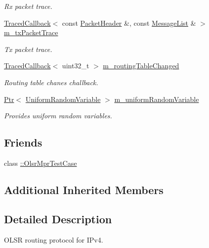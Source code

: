 \begin{DoxyCompactItemize}
\begin{DoxyCompactList}\small\item\em Rx packet trace. \end{DoxyCompactList}\item 
\hyperlink{classns3_1_1TracedCallback}{Traced\+Callback}$<$ const \hyperlink{classns3_1_1olsr_1_1PacketHeader}{Packet\+Header} \&, const \hyperlink{namespacens3_1_1olsr_af17c710718a5637d01f37804a0a53e78}{Message\+List} \& $>$ \hyperlink{classns3_1_1olsr_1_1RoutingProtocol_aadd8d4fea9a32b185bf23d787004de9d}{m\+\_\+tx\+Packet\+Trace}
\begin{DoxyCompactList}\small\item\em Tx packet trace. \end{DoxyCompactList}\item 
\hyperlink{classns3_1_1TracedCallback}{Traced\+Callback}$<$ uint32\+\_\+t $>$ \hyperlink{classns3_1_1olsr_1_1RoutingProtocol_a1cbaa4bdf90462b6d8e0ddc90eaa4130}{m\+\_\+routing\+Table\+Changed}
\begin{DoxyCompactList}\small\item\em Routing table chanes challback. \end{DoxyCompactList}\item 
\hyperlink{classns3_1_1Ptr}{Ptr}$<$ \hyperlink{classns3_1_1UniformRandomVariable}{Uniform\+Random\+Variable} $>$ \hyperlink{classns3_1_1olsr_1_1RoutingProtocol_a5aacf6e47c25a9cedfb2998d09e05193}{m\+\_\+uniform\+Random\+Variable}
\begin{DoxyCompactList}\small\item\em Provides uniform random variables. \end{DoxyCompactList}\end{DoxyCompactItemize}
\subsection*{Friends}
\begin{DoxyCompactItemize}
\item 
class \hyperlink{classns3_1_1olsr_1_1RoutingProtocol_a207c4dff8592b10a0fa2924d05c40380}{\+::\+Olsr\+Mpr\+Test\+Case}
\end{DoxyCompactItemize}
\subsection*{Additional Inherited Members}


\subsection{Detailed Description}
O\+L\+SR routing protocol for I\+Pv4. 

